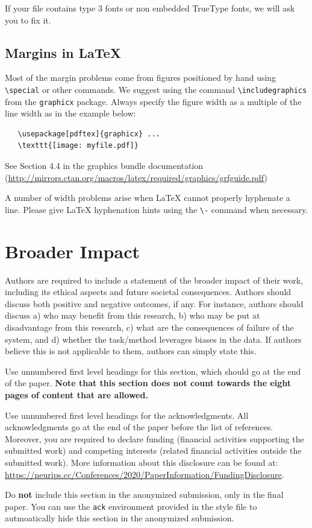 \documentclass{article}
\begin{document}
If your file contains type 3 fonts or non embedded TrueType fonts, we will ask
you to fix it.

\subsection{Margins in \LaTeX{}}

Most of the margin problems come from figures positioned by hand using
\verb+\special+ or other commands. We suggest using the command
\verb+\includegraphics+ from the \verb+graphicx+ package. Always specify the
figure width as a multiple of the line width as in the example below:
\begin{verbatim}
   \usepackage[pdftex]{graphicx} ...
   \texttt{[image: myfile.pdf]}
\end{verbatim}
See Section 4.4 in the graphics bundle documentation
(\url{http://mirrors.ctan.org/macros/latex/required/graphics/grfguide.pdf})

A number of width problems arise when \LaTeX{} cannot properly hyphenate a
line. Please give LaTeX hyphenation hints using the \verb+\-+ command when
necessary.


\section*{Broader Impact}

Authors are required to include a statement of the broader impact of their work, including its ethical aspects and future societal consequences. 
Authors should discuss both positive and negative outcomes, if any. For instance, authors should discuss a) 
who may benefit from this research, b) who may be put at disadvantage from this research, c) what are the consequences of failure of the system, and d) whether the task/method leverages
biases in the data. If authors believe this is not applicable to them, authors can simply state this.

Use unnumbered first level headings for this section, which should go at the end of the paper. {\bf Note that this section does not count towards the eight pages of content that are allowed.}

\begin{ack}
Use unnumbered first level headings for the acknowledgments. All acknowledgments
go at the end of the paper before the list of references. Moreover, you are required to declare 
funding (financial activities supporting the submitted work) and competing interests (related financial activities outside the submitted work). 
More information about this disclosure can be found at: \url{https://neurips.cc/Conferences/2020/PaperInformation/FundingDisclosure}.


Do {\bf not} include this section in the anonymized submission, only in the final paper. You can use the \texttt{ack} environment provided in the style file to autmoatically hide this section in the anonymized submission.
\end{ack}
\end{document}

